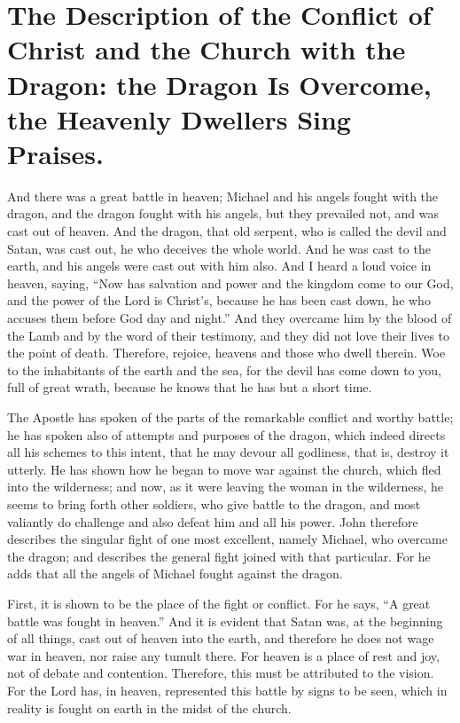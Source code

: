 \chapter[Sermon 53. The Description of the Conflict of Christ and the Church with the Dragon: the Dragon Is Overcome, the Heavenly Dwellers Sing Praises.]{The Description of the Conflict of Christ and the Church with the Dragon: the Dragon Is Overcome, the Heavenly Dwellers Sing Praises.}
\label{sermon:053}

And there was a great battle in heaven; Michael and his angels fought with the dragon, and the dragon fought with his angels, but they prevailed not, and was cast out of heaven. And the dragon, that old serpent, who is called the devil and Satan, was cast out, he who deceives the whole world. And he was cast to the earth, and his angels were cast out with him also. And I heard a loud voice in heaven, saying, “Now has salvation and power and the kingdom come to our God, and the power of the Lord is Christ’s, because he has been cast down, he who accuses them before God day and night.” And they overcame him by the blood of the Lamb and by the word of their testimony, and they did not love their lives to the point of death. Therefore, rejoice, heavens and those who dwell therein. Woe to the inhabitants of the earth and the sea, for the devil has come down to you, full of great wrath, because he knows that he has but a short time.

The Apostle has spoken of the parts of the remarkable conflict and worthy battle; he has spoken also of attempts and purposes of the dragon, which indeed directs all his schemes to this intent, that he may devour all godliness, that is, destroy it utterly. He has shown how he began to move war against the church, which fled into the wilderness; and now, as it were leaving the woman in the wilderness, he seems to bring forth other soldiers, who give battle to the dragon, and most valiantly do challenge and also defeat him and all his power. John therefore describes the singular fight of one most excellent, namely Michael, who overcame the dragon; and describes the general fight joined with that particular. For he adds that all the angels of Michael fought against the dragon.

First, it is shown to be the place of the fight or conflict. For he says, “A great battle was fought in heaven.” And it is evident that Satan was, at the beginning of all things, cast out of heaven into the earth, and therefore he does not wage war in heaven, nor raise any tumult there. For heaven is a place of rest and joy, not of debate and contention. Therefore, this must be attributed to the vision. For the Lord has, in heaven, represented this battle by signs to be seen, which in reality is fought on earth in the midst of the church.


